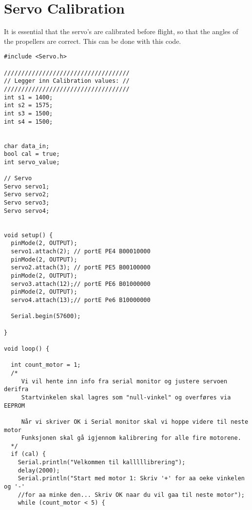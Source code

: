 \section{Servo Calibration}

It is essential that the servo's are calibrated before flight, so that the angles of the propellers are correct. This can be done with this code. 

\begin{lstlisting}
#include <Servo.h>
 
////////////////////////////////////
// Legger inn Calibration values: //
////////////////////////////////////
int s1 = 1400;
int s2 = 1575;
int s3 = 1500;
int s4 = 1500;
 

char data_in;
bool cal = true;
int servo_value;
 
// Servo
Servo servo1;
Servo servo2;
Servo servo3;
Servo servo4;
 
 
void setup() {
  pinMode(2, OUTPUT);
  servo1.attach(2); // portE PE4 B00010000
  pinMode(2, OUTPUT);
  servo2.attach(3); // portE PE5 B00100000
  pinMode(2, OUTPUT);
  servo3.attach(12);// portE PE6 B01000000
  pinMode(2, OUTPUT);
  servo4.attach(13);// portE Pe6 B10000000
 
  Serial.begin(57600);
 
}
 
void loop() {
 
  int count_motor = 1;
  /*
     Vi vil hente inn info fra serial monitor og justere servoen derifra
     Startvinkelen skal lagres som "null-vinkel" og overføres via EEPROM
 
     Når vi skriver OK i Serial monitor skal vi hoppe videre til neste motor
     Funksjonen skal gå igjennom kalibrering for alle fire motorene.
  */
  if (cal) {
    Serial.println("Velkommen til kalllllibrering");
    delay(2000);
    Serial.println("Start med motor 1: Skriv '+' for aa oeke vinkelen og '-'
    //for aa minke den... Skriv OK naar du vil gaa til neste motor");
    while (count_motor < 5) {
 

\end{lstlisting}
